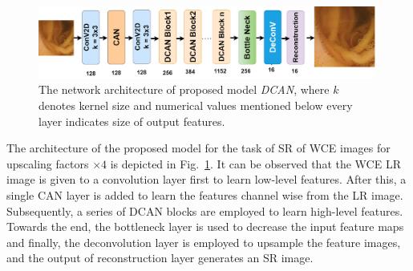 \documentclass[conference]{IEEEtran}
\begin{document}
\begin{figure}[t!]
    \centering
    \includegraphics[width=0.99\textwidth]{1_fff.drawio.png} 
    \caption{The network architecture of proposed model \emph{DCAN}, where $k$ denotes kernel size and numerical values mentioned below every layer indicates size of output features.}
    \label{fig:label6.8}
\end{figure}
The architecture of the proposed model for the task of SR of WCE images for upscaling factors $\times 4$ is depicted in Fig.~\ref{fig:label6.8}. It can be observed that the WCE LR image is given to a convolution layer first to learn low-level features. After this, a single CAN layer is added to learn the features channel wise from the LR image. Subsequently, a series of DCAN blocks are employed to learn high-level features. Towards the end, the bottleneck layer is used to decrease the input feature maps and finally, the deconvolution layer is employed to upsample the feature images, and the output of reconstruction layer generates an SR image.
\end{document}
